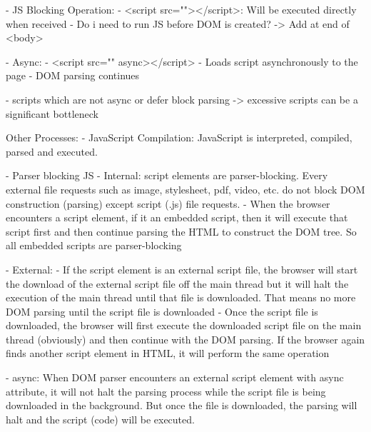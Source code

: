 

- JS Blocking Operation:
	- <script src=""></script>: Will be executed directly when received
	- Do i need to run JS before DOM is created?
	-> Add at end of <body>

- Async:
	- <script src="" async></script>
	- Loads script asynchronously to the page
	- DOM parsing continues
	
	
- scripts which are not async or defer block parsing -> excessive scripts can be a significant bottleneck



Other Processes:
- JavaScript Compilation: JavaScript is interpreted, compiled, parsed and executed.





- Parser blocking JS
- Internal: script elements are parser-blocking. Every external file requests such as image, stylesheet, pdf, video, etc. do not block DOM construction (parsing) except script (.js) file requests.
- When the browser encounters a script element, if it an embedded script, then it will execute that script first and then continue parsing the HTML to construct the DOM tree. So all embedded scripts are parser-blocking

- External:
- If the script element is an external script file, the browser will start the download of the external script file off the main thread but it will halt the execution of the main thread until that file is downloaded. That means no more DOM parsing until the script file is downloaded
- Once the script file is downloaded, the browser will first execute the downloaded script file on the main thread (obviously) and then continue with the DOM parsing. If the browser again finds another script element in HTML, it will perform the same operation

- async:
When DOM parser encounters an external script element with async attribute, it will not halt the parsing process while the script file is being downloaded in the background. But once the file is downloaded, the parsing will halt and the script (code) will be executed.


